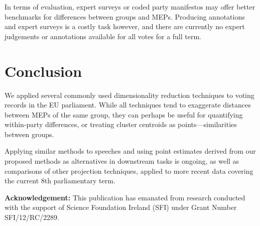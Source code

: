 \documentclass{llncs}
\begin{document}
In terms of evaluation, expert surveys\cite{mcelroy2012policy} or coded party manifestos\cite{manifesto} may offer better benchmarks for differences between groups and MEPs. Producing annotations and expert surveys is a costly task however, and there are currently no expert judgements or annotations available for all votes for a full term.

\section{Conclusion}
We applied several commonly used dimensionality reduction techniques to voting records in the EU parliament. While all techniques tend to exaggerate distances between MEPs of the same group, they can perhaps be useful for quantifying within-party differences, or treating cluster centroids as points---similarities between groups.

Applying similar methods to speeches and using point estimates derived from our proposed methods as alternatives in downstream tasks is ongoing, as well as comparisons of other projection techniques, applied to more recent data covering the current 8th parliamentary term.

\vspace{3mm}
\noindent\textbf{Acknowledgement:} This publication has emanated from research conducted with the support of Science Foundation Ireland (SFI) under Grant Number SFI/12/RC/2289.


 
\end{document}

